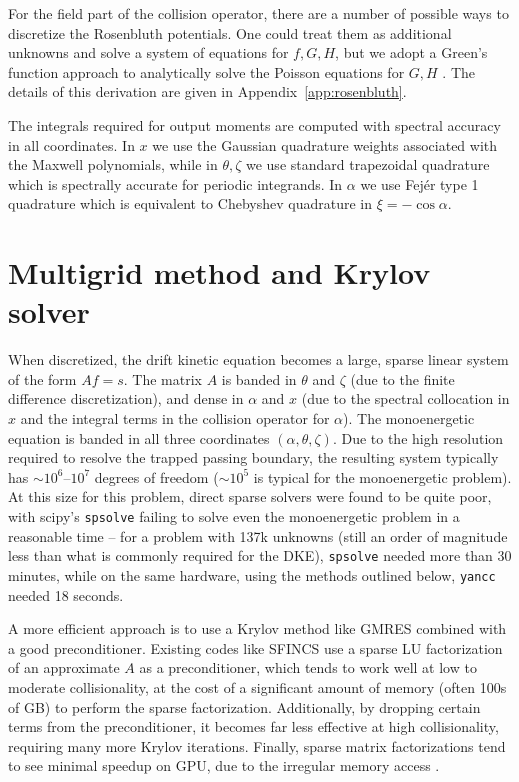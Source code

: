 \documentclass[11pt]{article}
\newcommand{\yancc}{\texttt{yancc}}
\begin{document}
For the field part of the collision operator, there are a number of possible
ways to discretize the Rosenbluth potentials. One could treat them as additional
unknowns and solve a system of equations for $f, G, H$, but we adopt a Green's
function approach to analytically solve the Poisson equations for $G, H$
\cite{mollen_impurities_2015}. The details of this derivation are given in
Appendix~\ref{app:rosenbluth}.

The integrals required for output moments are computed with spectral accuracy in
all coordinates. In $x$ we use the Gaussian quadrature weights associated with
the Maxwell polynomials, while in $\theta,\zeta$ we use standard trapezoidal
quadrature which is spectrally accurate for periodic integrands. In $\alpha$ we
use Fej\'er type 1 quadrature which is equivalent to Chebyshev quadrature in
$\xi = -\cos \alpha$.

\section{Multigrid method and Krylov solver}
\label{sec:multigrid}

When discretized, the drift kinetic equation becomes a large, sparse linear
system of the form $Af=s$. The matrix $A$ is banded in $\theta$ and $\zeta$ (due
to the finite difference discretization), and dense in $\alpha$ and $x$ (due to
the spectral collocation in $x$ and the integral terms in the collision operator
for $\alpha$). The monoenergetic equation is banded in all three coordinates
$(\alpha, \theta, \zeta)$. Due to the high resolution required to resolve the
trapped passing boundary, the resulting system typically has $\sim 10^6$--$10^7$
degrees of freedom ($\sim 10^5$ is typical for the monoenergetic problem). At
this size for this problem, direct sparse solvers were found to be quite poor,
with scipy's \texttt{spsolve} \cite{virtanen_scipy_2020, demmel_supernodal_1999}
failing to solve even the monoenergetic
problem in a reasonable time -- for a problem with 137k unknowns (still an order of
magnitude less than what is commonly required for the DKE), \texttt{spsolve} needed
more than 30 minutes, while on the same hardware, using the methods outlined below,
\yancc{} needed 18 seconds.

A more efficient approach is to use a Krylov method like GMRES combined with a
good preconditioner. Existing codes like SFINCS use a sparse LU factorization of
an approximate $A$ as a preconditioner, which tends to work well at low to
moderate collisionality, at the cost of a significant amount of memory (often
100s of GB) to perform the sparse factorization. Additionally, by dropping
certain terms from the preconditioner, it becomes far less effective at high
collisionality, requiring many more Krylov iterations. Finally, sparse matrix
factorizations tend to see minimal speedup on GPU, due to the irregular memory
access \cite{silva_distributed_2014, gale_sparse_2020, claus_graphics_2025}.
\end{document}
